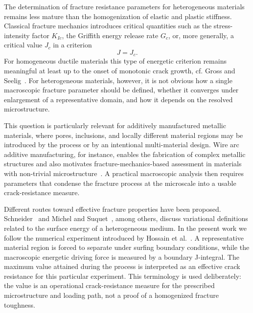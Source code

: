 \documentclass[pdflatex,sn-mathphys-num]{sn-jnl}
\begin{document}
The determination of fracture resistance parameters for heterogeneous materials remains less mature than the homogenization of elastic and plastic stiffness. Classical fracture mechanics introduces critical quantities such as the stress-intensity factor \(K_{Ic}\), the Griffith energy release rate \(G_c\), or, more generally, a critical value \(J_c\) in a criterion
\begin{equation}
    J = J_c .
    \label{eq:fracture_criterion_J}
\end{equation}
For homogeneous ductile materials this type of energetic criterion remains meaningful at least up to the onset of monotonic crack growth, cf. Gross and Seelig~\cite{gross_fracture_2011}. For heterogeneous materials, however, it is not obvious how a single macroscopic fracture parameter should be defined, whether it converges under enlargement of a representative domain, and how it depends on the resolved microstructure.

This question is particularly relevant for additively manufactured metallic materials, where pores, inclusions, and locally different material regions may be introduced by the process or by an intentional multi-material design. Wire arc additive manufacturing, for instance, enables the fabrication of complex metallic structures and also motivates fracture-mechanics-based assessment in materials with non-trivial microstructure~\cite{hauser_porosity_2021}. A practical macroscopic analysis then requires parameters that condense the fracture process at the microscale into a usable crack-resistance measure.

Different routes toward effective fracture properties have been proposed. Schneider~\cite{schneider_fftbased_2020} and Michel and Suquet~\cite{michel_merits_2022}, among others, discuss variational definitions related to the surface energy of a heterogeneous medium. In the present work we follow the numerical experiment introduced by Hossain et al.~\cite{hossain_effective_2014}. A representative material region is forced to separate under surfing boundary conditions, while the macroscopic energetic driving force is measured by a boundary J-integral. The maximum value attained during the process is interpreted as an effective crack resistance for this particular experiment. This terminology is used deliberately: the value is an operational crack-resistance measure for the prescribed microstructure and loading path, not a proof of a homogenized fracture toughness.
\end{document}
